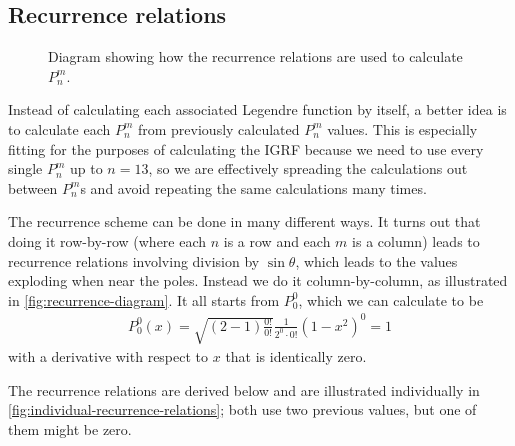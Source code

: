 \documentclass[12pt]{article}
\begin{document}
\subsection{Recurrence relations}
\begin{figure}[htbp]
  \centering
  \caption{Diagram showing how the recurrence relations are used to calculate $P_n^m$.}
  \label{fig:recurrence-diagram}
\end{figure}

Instead of calculating each associated Legendre function by itself, a better idea is to calculate each $P_n^m$ from previously calculated $P_n^m$ values. This is especially fitting for the purposes of calculating the IGRF because we need to use every single $P_n^m$ up to $n=13$, so we are effectively spreading the calculations out between $P_n^m$s and avoid repeating the same calculations many times. 

The recurrence scheme can be done in many different ways. It turns out that doing it row-by-row (where each $n$ is a row and each $m$ is a column) leads to recurrence relations involving division by $\sin\theta$, which leads to the values exploding when near the poles. Instead we do it column-by-column, as illustrated in \autoref{fig:recurrence-diagram}. It all starts from $P_0^0$, which we can calculate to be 
\begin{align}
  P_0^0(x) = \sqrt{(2 - 1)\frac{0!}{0!}}\frac{1}{2^0\cdot 0!}(1 - x^2)^0 = 1
\end{align}
with a derivative with respect to $x$ that is identically zero.

The recurrence relations are derived below and are illustrated individually in \autoref{fig:individual-recurrence-relations}; both use two previous values, but one of them might be zero.
\end{document}
